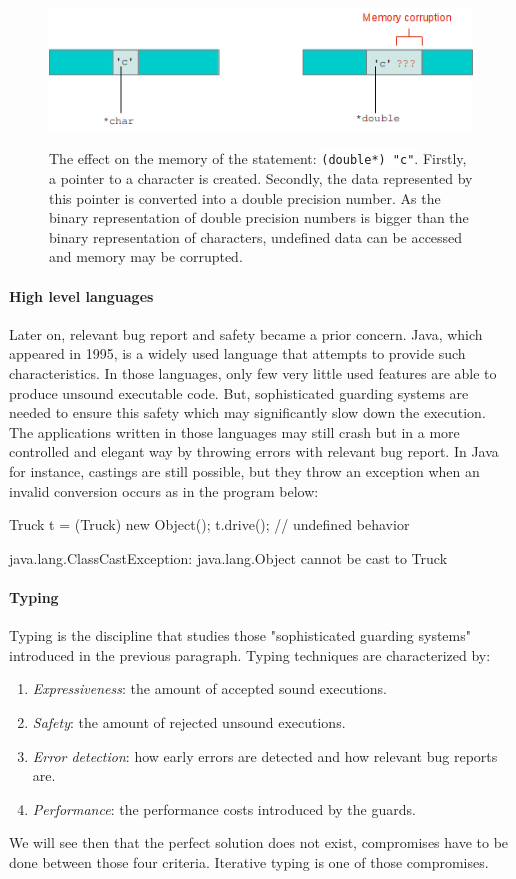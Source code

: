 \documentclass[a4paper]{report}
\newcommand{\icansi}[1]{\colorbox{white}{\lstinline[language=code]&#1&}} %
\begin{document}
\begin{figure}
\centering
\includegraphics{images/memo_corrupt.png}
\label{memo_corrupt}
\caption{The effect on the memory of the statement: \icansi{(double*) "c"}. Firstly, a pointer to a  character is created. Secondly, the data represented by this pointer is converted into a double precision number. As the binary representation of double precision numbers is bigger than the binary representation of characters, undefined data can be accessed and memory may be corrupted.}
\end{figure}

\paragraph{High level languages} Later on, relevant bug report and safety became a prior concern. Java, which appeared in 1995, is a widely used language that attempts to provide such characteristics. In those languages, only few very little used features are able to produce unsound executable code. But, sophisticated guarding systems are needed to ensure this safety which may significantly slow down the execution. The applications written in those languages may still crash but in a more controlled and elegant way by throwing errors with relevant bug report. In Java for instance, castings are still possible, but they throw an exception when an invalid conversion occurs as in the program below:
\begin{java}
Truck t = (Truck) new Object();
t.drive();                      // undefined behavior
\end{java}
\begin{shell}
java.lang.ClassCastException: java.lang.Object cannot be cast to Truck
\end{shell}

\paragraph{Typing} Typing is the discipline that studies those "sophisticated guarding systems" introduced in the previous paragraph. Typing techniques are characterized by:
\begin{enumerate}
\item \emph{Expressiveness}: the amount of accepted sound executions.
\item \emph{Safety}: the amount of rejected unsound executions.
\item \emph{Error detection}: how early errors are detected and how relevant bug reports are.
\item \emph{Performance}: the performance costs introduced by the guards.
\end{enumerate}
We will see then that the perfect solution does not exist, compromises have to be done between those four criteria. Iterative typing is one of those compromises.
\end{document}
